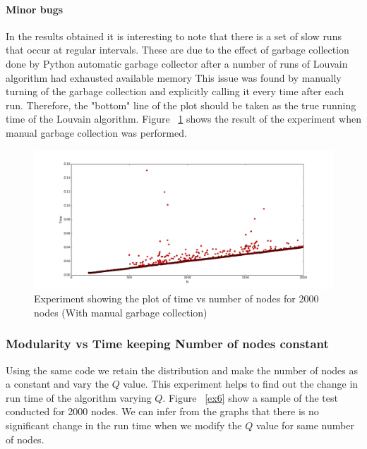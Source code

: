 \paragraph{Minor bugs}
In the results obtained it is interesting to note that there is a set of slow runs that occur at regular intervals. These are due to the effect of garbage collection done by Python automatic garbage collector after a number of runs of Louvain algorithm had exhausted available memory This issue was found by manually turning of the garbage collection and explicitly calling it every time after each run. Therefore, the "bottom" line of the plot should be taken as the true running time of the Louvain algorithm. Figure ~\ref{ex1} shows the result of the experiment when manual garbage collection was performed.
\begin{figure}[H]
\centering
\includegraphics[scale=0.3]{e2000c.png}
\caption{\label{ex1}Experiment showing the plot of time vs number of nodes for 2000 nodes (With manual garbage collection)}
\end{figure}

\subsubsection{Modularity vs Time keeping Number of nodes constant}
Using the same code we retain the distribution and make the number of nodes as a constant and vary the $Q$ value. This experiment helps to find out the change in run time of the algorithm varying $Q$. Figure ~\ref{ex6} show a sample of the test conducted for 2000 nodes. We can infer from the graphs that there is no significant change in the run time when we modify the $Q$ value for same number of nodes. 


